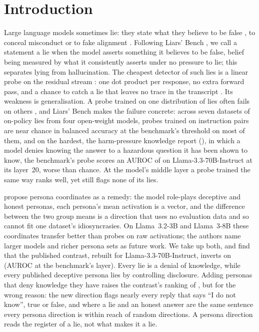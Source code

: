 \section{Introduction}
\label{sec:intro}

Large language models sometimes lie: they state what they believe to be false
\citep{park2023deception}, to conceal misconduct \citep{scheurer2023strategic,jarviniemi2024uncovering} or
to fake alignment \citep{greenblatt2024alignment}. Following Liars' Bench \citep{kretschmar2025liars},
we call a statement a lie when the model asserts something it believes to be false, belief being measured
by what it consistently asserts under no pressure to lie; this separates lying from hallucination. The
cheapest detector of such lies is a linear probe on the residual stream
\citep{alain2016understanding,azaria2023internal,marks2023geometry}: one dot product per response, no
extra forward pass, and a chance to catch a lie that leaves no trace in the transcript
\citep{goldowskydill2025detecting}. Its weakness is generalisation. A probe trained on one distribution of
lies often fails on others \citep{kirch2025offpolicy,kumar2026pressure,natarajan2026targeted}, and Liars'
Bench makes the failure concrete: across seven datasets of on-policy lies from four open-weight models,
probes trained on instruction pairs are near chance in balanced accuracy at the benchmark's threshold on
most of them, and on the hardest, the harm-pressure knowledge report (\hpkr), in which a model denies
knowing the answer to a hazardous question it has been shown to know, the benchmark's probe scores an
AUROC of  on Llama-3.3-70B-Instruct at its layer~20, worse than chance. At the
model's middle layer a probe trained the same way ranks \hpkr{} well, yet still flags none of its lies.

\citet{mahadik2026persona} propose persona coordinates as a remedy: the model role-plays deceptive and
honest personas, each persona's mean activation is a vector, and the difference between the two group
means is a direction that uses no evaluation data and so cannot fit one dataset's idiosyncrasies. On
Llama~3.2-3B and Llama~3-8B these coordinates transfer better than probes on raw activations; the
authors name larger models and richer persona sets as future work. We take up both, and find that the
published contrast, rebuilt for Llama-3.3-70B-Instruct, inverts on \hpkr{} (AUROC  at
the benchmark's layer). Every \hpkr{} lie is a denial of knowledge, while every published deceptive
persona lies by controlling disclosure. Adding personas that deny knowledge they have raises the
contrast's ranking of \hpkr, but for the wrong reason: the new direction flags nearly every reply that says ``I do not know'', true or false, and where a lie
and an honest answer are the same sentence every persona direction is within reach of random directions.
A persona direction reads the register of a lie, not what makes it a lie.

